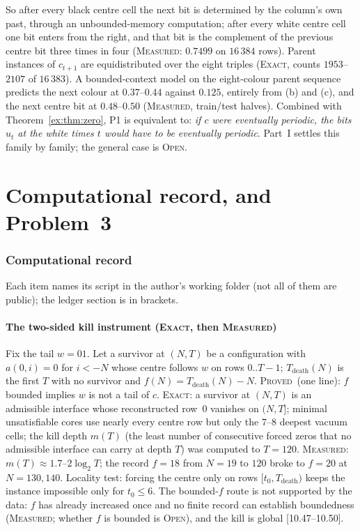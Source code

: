 \documentclass[11pt]{article}
\theoremstyle{definition}
\theoremstyle{remark}
\newcommand{\PROVED}{\textsc{Proved}}
\newcommand{\EXACT}{\textsc{Exact}}
\newcommand{\MEASURED}{\textsc{Measured}}
\newcommand{\OPEN}{\textsc{Open}}
\begin{document}
So after every black centre cell the next bit is determined by the column's own past, through an unbounded-memory computation; after every white centre cell one bit enters from the right, and that bit is the complement of the previous centre bit three times in four (\MEASURED: $0.7499$ on $16\,384$ rows). Parent instances of $c_{t+1}$ are equidistributed over the eight triples (\EXACT, counts $1953$--$2107$ of $16\,383$). A bounded-context model on the eight-colour parent sequence predicts the next colour at $0.37$--$0.44$ against $0.125$, entirely from (b) and (c), and the next centre bit at $0.48$--$0.50$ (\MEASURED, train/test halves). Combined with Theorem~\ref{ex:thm:zero}, P1 is equivalent to: \emph{if $c$ were eventually periodic, the bits $u_t$ at the white times $t$ would have to be eventually periodic}. Part~I settles this family by family; the general case is \OPEN.

\part{Computational record, and Problem~3}

\section{Computational record}\label{sec:record}

Each item names its script in the author's working folder (not all of them are public); the ledger section is in brackets.

\subsection*{The two-sided kill instrument (\EXACT, then \MEASURED)}
Fix the tail $w=01$. Let a survivor at $(N,T)$ be a configuration with $a(0,i)=0$ for $i<-N$ whose centre follows $w$ on rows $0..T-1$; $T_{\mathrm{death}}(N)$ is the first $T$ with no survivor and $f(N)=T_{\mathrm{death}}(N)-N$. \PROVED\ (one line): $f$ bounded implies $w$ is not a tail of $c$. \EXACT: a survivor at $(N,T)$ is an admissible interface whose reconstructed row~$0$ vanishes on $(N,T]$; minimal unsatisfiable cores use nearly every centre row but only the $7$--$8$ deepest vacuum cells; the kill depth $m(T)$ (the least number of consecutive forced zeros that no admissible interface can carry at depth $T$) was computed to $T=120$. \MEASURED: $m(T)\approx1.7$--$2\log_2T$; the record $f=18$ from $N=19$ to $120$ broke to $f=20$ at $N=130,140$. Locality test: forcing the centre only on rows $[t_0,T_{\mathrm{death}})$ keeps the instance impossible only for $t_0\le6$. The bounded-$f$ route is not supported by the data: $f$ has already increased once and no finite record can establish boundedness (\MEASURED; whether $f$ is bounded is \OPEN), and the kill is global [10.47--10.50].
\end{document}
